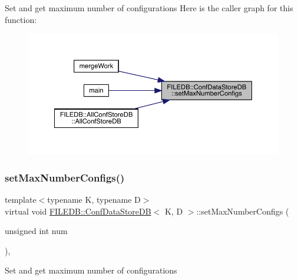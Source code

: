 Set and get maximum number of configurations Here is the caller graph for this function\+:\nopagebreak
\begin{figure}[H]
\begin{center}
\leavevmode
\includegraphics[width=350pt]{d8/d19/classFILEDB_1_1ConfDataStoreDB_acd6f44fc7a83322417ad1a7ea7d2b6ea_icgraph}
\end{center}
\end{figure}
\mbox{\label{classFILEDB_1_1ConfDataStoreDB_acd6f44fc7a83322417ad1a7ea7d2b6ea}} 
\subsubsection{\texorpdfstring{setMaxNumberConfigs()}{setMaxNumberConfigs()}\hspace{0.1cm}{\footnotesize\ttfamily [2/2]}}
{\footnotesize\ttfamily template$<$typename K, typename D$>$ \\
virtual void \mbox{\hyperlink{classFILEDB_1_1ConfDataStoreDB}{F\+I\+L\+E\+D\+B\+::\+Conf\+Data\+Store\+DB}}$<$ K, D $>$\+::set\+Max\+Number\+Configs (\begin{DoxyParamCaption}\item[{unsigned int}]{num }\end{DoxyParamCaption})\hspace{0.3cm}{\ttfamily [inline]}, {\ttfamily [virtual]}}

Set and get maximum number of configurations \mbox{\label{classFILEDB_1_1ConfDataStoreDB_a02a2fcc79ba97c11b4ec1ec0321e5415}} 
